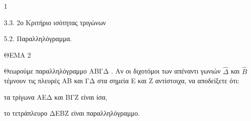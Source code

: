 \begin{ylh}{1}
    \item 3.3. 2ο Κριτήριο ισότητας τριγώνων
    \item 5.2. Παραλληλόγραμμα.
\end{ylh}

ΘΕΜΑ 2

Θεωρούμε παραλληλόγραμμο ΑΒΓΔ . Αν οι διχοτόμοι των απέναντι γωνιών $\widehat{\Delta}$ και $\widehat{Β}$ τέμνουν τις πλευρές ΑΒ και ΓΔ στα σημεία Ε και Ζ αντίστοιχα, να αποδείξετε ότι:

\begin{alist}
\item τα τρίγωνα ΑΕΔ και ΒΓΖ είναι ίσα, 

\item το τετράπλευρο ΔΕΒΖ είναι παραλληλόγραμμο. 
\end{alist}
